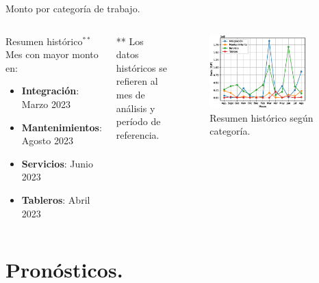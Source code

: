 \documentclass[aspectratio=169,xcolor=dvipsnames]{beamer}
\begin{document}
 \begin{frame}{Monto por categoría de trabajo.}
 \begin{columns}[c]
 \begin{block}{Resumen histórico$^{**}$}
    Mes con mayor monto en:
     \begin{itemize}
         \item \textbf{Integración}: Marzo 2023
         \item \textbf{Mantenimientos}: Agosto 2023
         \item \textbf{Servicios}: Junio 2023
         \item \textbf{Tableros}: Abril 2023
     \end{itemize}
 \end{block}
 \begin{block}{}
    \tiny{** Los datos históricos se refieren al mes de análisis y período de referencia.}
\end{block} 
 \begin{figure}
     \includegraphics[width=0.85\textwidth]{EPS/servicio_monto2.eps}
     \caption{Resumen histórico según categoría.}
     \label{graph:servicio_monto2}
\end{figure}
 \end{columns}
\end{frame}


\section{Pronósticos.}
\end{document}
